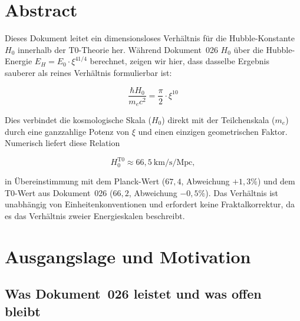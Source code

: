 
\section*{Abstract}

Dieses Dokument leitet ein dimensionsloses Verhältnis für die Hubble-Konstante
$H_0$ innerhalb der T0-Theorie her. Während Dokument~026 $H_0$ über die
Hubble-Energie $E_H = E_0 \cdot \xi^{41/4}$ berechnet, zeigen wir hier,
dass dasselbe Ergebnis sauberer als reines Verhältnis formulierbar ist:

\begin{equation}
    \boxed{\frac{\hbar H_0}{m_e c^2} = \frac{\pi}{2} \cdot \xi^{10}}
    \label{eq:h0_ratio_main}
\end{equation}

Dies verbindet die kosmologische Skala ($H_0$) direkt mit der Teilchenskala
($m_e$) durch eine ganzzahlige Potenz von $\xi$ und einen einzigen
geometrischen Faktor. Numerisch liefert diese Relation

\[
H_0^{\text{T0}} \approx 66{,}5 \ \text{km/s/Mpc},
\]

in Übereinstimmung mit dem Planck-Wert ($67{,}4$, Abweichung $+1{,}3\%$) und dem
T0-Wert aus Dokument~026 ($66{,}2$, Abweichung $-0{,}5\%$). Das Verhältnis
ist unabhängig von Einheitenkonventionen und erfordert keine Fraktalkorrektur,
da es das Verhältnis zweier Energieskalen beschreibt.

\clearpage

\section{Ausgangslage und Motivation}
\label{sec:motivation}

\subsection{Was Dokument~026 leistet und was offen bleibt}

